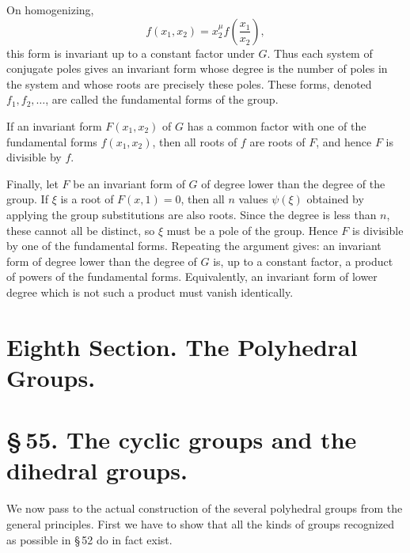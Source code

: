 \documentclass[11pt]{article}
\begin{document}
On homogenizing,
\begin{equation}
f(x_1,x_2)=x_2^\mu f\left(\frac{x_1}{x_2}\right),
\tag{7}
\end{equation}
this form is invariant up to a constant factor under $G$. Thus each system of conjugate poles gives an invariant form whose degree is the number of poles in the system and whose roots are precisely these poles. These forms, denoted $f_1,f_2,\ldots$, are called the fundamental forms of the group.

If an invariant form $F(x_1,x_2)$ of $G$ has a common factor with one of the fundamental forms $f(x_1,x_2)$, then all roots of $f$ are roots of $F$, and hence $F$ is divisible by $f$.

Finally, let $F$ be an invariant form of $G$ of degree lower than the degree of the group. If $\xi$ is a root of $F(x,1)=0$, then all $n$ values $\psi(\xi)$ obtained by applying the group substitutions are also roots. Since the degree is less than $n$, these cannot all be distinct, so $\xi$ must be a pole of the group. Hence $F$ is divisible by one of the fundamental forms. Repeating the argument gives: an invariant form of degree lower than the degree of $G$ is, up to a constant factor, a product of powers of the fundamental forms. Equivalently, an invariant form of lower degree which is not such a product must vanish identically.

\clearpage

\clearpage
\section*{Eighth Section. The Polyhedral Groups.}

\section*{\S\,55. The cyclic groups and the dihedral groups.}

We now pass to the actual construction of the several polyhedral groups from the general principles. First we have to show that all the kinds of groups recognized as possible in \S\,52 do in fact exist.
\end{document}
